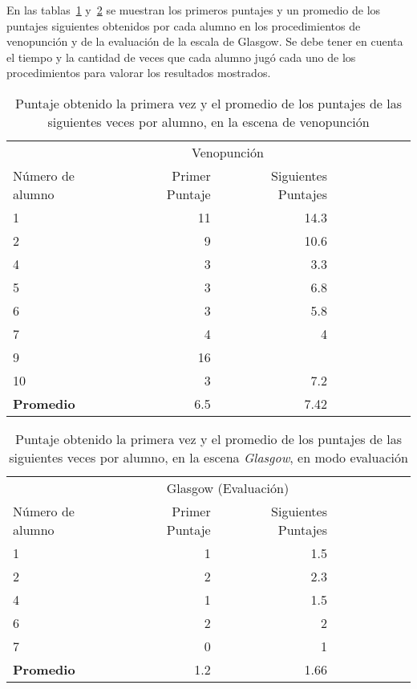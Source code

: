 En las tablas~\ref{tab:log_hemocultivo_puntaje}
y~\ref{tab:log_glasgow_random_puntaje} se muestran los primeros puntajes y un
promedio de los puntajes siguientes obtenidos por cada alumno en los
procedimientos de venopunción y de la evaluación de la escala de
Glasgow. Se debe tener en cuenta el tiempo y la cantidad de veces que cada
alumno jugó cada uno de los procedimientos para valorar los resultados
mostrados. 

\begin{table}[H]
\centering
\begin{tabular}{lrrrrrrrr}
\toprule
& \multicolumn{2}{c}{Venopunción} \\
\cmidrule(lr){2-3} 
Número de alumno  & Primer Puntaje & Siguientes Puntajes \\
\midrule
 1                & 11             & 14.3 \\
 2                & 9              & 10.6 \\
 4                & 3              & 3.3  \\
 5                & 3              & 6.8  \\
 6                & 3              & 5.8  \\
 7                & 4              & 4    \\
 9                & 16             & \\
10                & 3              & 7.2  \\
\midrule
\textbf{Promedio} & 6.5            & 7.42 \\
\bottomrule
\end{tabular}
\caption{Puntaje obtenido la primera vez y el promedio de los puntajes de las siguientes veces
    por alumno, en la escena de venopunción}
\label{tab:log_hemocultivo_puntaje}
\end{table}


\begin{table}[H]
\centering
\begin{tabular}{lrrrrrrrr}
\toprule
& \multicolumn{2}{c}{Glasgow (Evaluación)} \\
                   \cmidrule(lr){2-3} 
Número de alumno   & Primer Puntaje & Siguientes Puntajes \\
\midrule
1     & 1 & 1.5 \\
2     & 2 & 2.3 \\
4     & 1 & 1.5 \\
6     & 2 & 2 \\
7     & 0 & 1 \\
\midrule
\textbf{Promedio} & 1.2 & 1.66 \\
\bottomrule
\end{tabular}
\caption{Puntaje obtenido la primera vez y el promedio de los puntajes de las siguientes veces
    por alumno, en la escena \textit{Glasgow}, en modo evaluación}
\label{tab:log_glasgow_random_puntaje}
\end{table}

